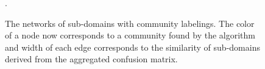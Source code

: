 \begin{figure}
\caption{The networks of sub-domains with community labelings. The color of a node now corresponds to a community found by the algorithm and width of each edge corresponds to the similarity of sub-domains derived from the aggregated confusion matrix.} \label{meta_network_community} \label{meta_network_community}.
\end{figure}





